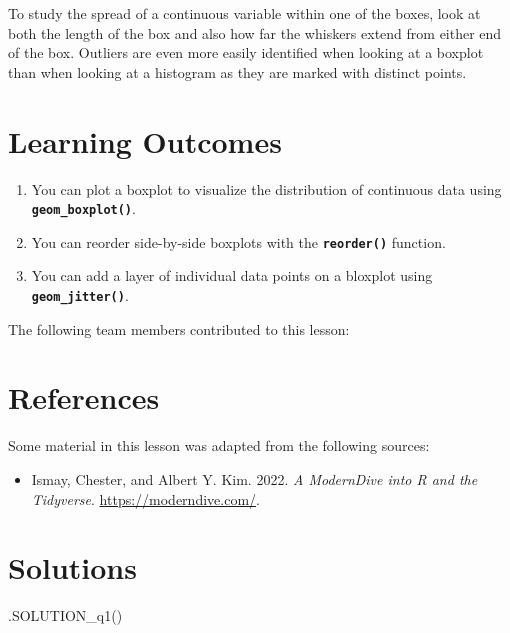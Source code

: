 \documentclass[
  letterpaper,
  DIV=11,
  numbers=noendperiod]{scrreprt}
\newenvironment{Shaded}{\begin{snugshade}}{\end{snugshade}}
\newcommand{\FunctionTok}[1]{\textcolor[rgb]{0.28,0.35,0.67}{#1}}
\newcommand{\NormalTok}[1]{\textcolor[rgb]{0.00,0.23,0.31}{#1}}
\providecommand{\tightlist}{%
  \setlength{\itemsep}{0pt}\setlength{\parskip}{0pt}}\usepackage{longtable,booktabs,array}
\begin{document}
To study the spread of a continuous variable within one of the boxes,
look at both the length of the box and also how far the whiskers extend
from either end of the box. Outliers are even more easily identified
when looking at a boxplot than when looking at a histogram as they are
marked with distinct points.

\hypertarget{learning-outcomes-1}{%
\section{Learning Outcomes}\label{learning-outcomes-1}}

\begin{enumerate}
\def\labelenumi{\arabic{enumi}.}
\tightlist
\item
  You can plot a boxplot to visualize the distribution of continuous
  data using \textbf{\texttt{geom\_boxplot()}}.
\item
  You can reorder side-by-side boxplots with the
  \textbf{\texttt{reorder()}} function.
\item
  You can add a layer of individual data points on a bloxplot using
  \textbf{\texttt{geom\_jitter()}}.
\end{enumerate}

The following team members contributed to this lesson:

\hypertarget{references-4}{%
\section*{References}\label{references-4}}


Some material in this lesson was adapted from the following sources:

\begin{itemize}
\tightlist
\item
  Ismay, Chester, and Albert Y. Kim. 2022. \emph{A ModernDive into R and
  the Tidyverse}. \url{https://moderndive.com/}.
\end{itemize}

\hypertarget{solutions-4}{%
\section{Solutions}\label{solutions-4}}

\begin{Shaded}
\begin{Highlighting}[]
\FunctionTok{.SOLUTION\_q1}\NormalTok{()}
\end{Highlighting}
\end{Shaded}
\end{document}

